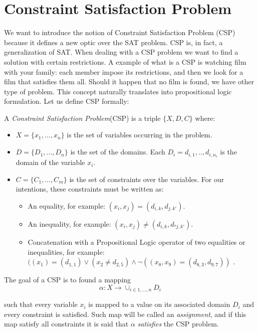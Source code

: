 \section{Constraint Satisfaction Problem}
  
We want to introduce the notion of Constraint Satisfaction Problem (CSP) because it defines a new optic over the SAT problem. CSP is, in fact, a generalization of SAT. When dealing with a CSP problem we want to find a solution with certain restrictions. A example of what is a CSP is watching film with your family: each member impose its restrictions, and then we look for a film that satisfies them all. Should it happen that no film is found, we have other type of problem. This concept naturally translates into propositional logic formulation. Let us define CSP formally:

\begin{definition}
  A \emph{Constraint Satisfaction Problem}(CSP) is a triple $\{X,D,C\}$ where:
  \begin{itemize}
  \item $X=\{x_1,...,x_n\}$ is the set of variables  occurring in the problem.
  \item $D=\{D_1,...,D_n\}$ is the set of the domains. Each $D_i={d_{i,1},..,d_{i,n_i}}$ is the domain of the variable $x_i$.
  \item $C=\{C_1,...,C_m\}$ is the set of constraints over the variables. For our intentions, these constraints must be written as:
    \begin{itemize}
    \item An equality, for example: $(x_i, x_j) = (d_{i,k}, d_{j,k'})$.
    \item An inequality, for example: $(x_i, x_j) \ne (d_{i,k}, d_{ºj,k'})$.
    \item Concatenation with a Propositional Logic operator of two equalities or inequalities, for example: $((x_1) = (d_{1,1}) \vee (x_2 \ne d_{2,5}) \wedge \neg((x_8,x_9) = (d_{8,3},d_{9,7}))$ .
    \end{itemize}
  \end{itemize}
\end{definition}
  The goal of a CSP is to found a mapping \[ \alpha:X\to \cup_{i\in 1,...,n} D_i\]
  
  such that every variable $x_i$ is mapped to a value on its associated domain $D_i$ and every constraint is satisfied. Such map will be called an \emph{assignment}, and if this map satisfy all constraints it is said that $\alpha$ \emph{satisfies} the CSP problem.\\


